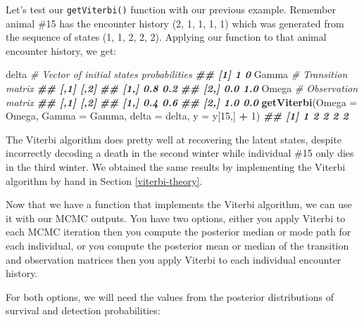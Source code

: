 \documentclass[
  12pt,
]{krantz}
\newenvironment{Shaded}{\begin{snugshade}}{\end{snugshade}}
\newcommand{\AttributeTok}[1]{\textcolor[rgb]{0.13,0.29,0.53}{#1}}
\newcommand{\CommentTok}[1]{\textcolor[rgb]{0.56,0.35,0.01}{\textit{#1}}}
\newcommand{\DecValTok}[1]{\textcolor[rgb]{0.00,0.00,0.81}{#1}}
\newcommand{\DocumentationTok}[1]{\textcolor[rgb]{0.56,0.35,0.01}{\textbf{\textit{#1}}}}
\newcommand{\FunctionTok}[1]{\textcolor[rgb]{0.13,0.29,0.53}{\textbf{#1}}}
\newcommand{\NormalTok}[1]{#1}
\newcommand{\OtherTok}[1]{\textcolor[rgb]{0.56,0.35,0.01}{#1}}
\newcommand{\SpecialCharTok}[1]{\textcolor[rgb]{0.81,0.36,0.00}{\textbf{#1}}}
\newcommand{\StringTok}[1]{\textcolor[rgb]{0.31,0.60,0.02}{#1}}
\begin{document}
Let's test our \texttt{getViterbi()} function with our previous example. Remember animal \#15 has the encounter history (2, 1, 1, 1, 1) which was generated from the sequence of states (1, 1, 2, 2, 2). Applying our function to that animal encounter history, we get:

\begin{Shaded}
\begin{Highlighting}[]
\NormalTok{delta }\CommentTok{\# Vector of initial states probabilities}
\DocumentationTok{\#\# [1] 1 0}
\NormalTok{Gamma }\CommentTok{\# Transition matrix}
\DocumentationTok{\#\#      [,1] [,2]}
\DocumentationTok{\#\# [1,]  0.8  0.2}
\DocumentationTok{\#\# [2,]  0.0  1.0}
\NormalTok{Omega }\CommentTok{\# Observation matrix}
\DocumentationTok{\#\#      [,1] [,2]}
\DocumentationTok{\#\# [1,]  0.4  0.6}
\DocumentationTok{\#\# [2,]  1.0  0.0}
\FunctionTok{getViterbi}\NormalTok{(}\AttributeTok{Omega =}\NormalTok{ Omega, }
           \AttributeTok{Gamma =}\NormalTok{ Gamma, }
           \AttributeTok{delta =}\NormalTok{ delta, }
           \AttributeTok{y =}\NormalTok{ y[}\DecValTok{15}\NormalTok{,] }\SpecialCharTok{+} \DecValTok{1}\NormalTok{)}
\DocumentationTok{\#\# [1] 1 2 2 2 2}
\end{Highlighting}
\end{Shaded}

The Viterbi algorithm does pretty well at recovering the latent states, despite incorrectly decoding a death in the second winter while individual \#15 only dies in the third winter. We obtained the same results by implementing the Viterbi algorithm by hand in Section \ref{viterbi-theory}.

Now that we have a function that implements the Viterbi algorithm, we can use it with our MCMC outputs. You have two options, either you apply Viterbi to each MCMC iteration then you compute the posterior median or mode path for each individual, or you compute the posterior mean or median of the transition and observation matrices then you apply Viterbi to each individual encounter history.

For both options, we will need the values from the posterior distributions of survival and detection probabilities:

\begin{Shaded}
\end{Shaded}
\end{document}
